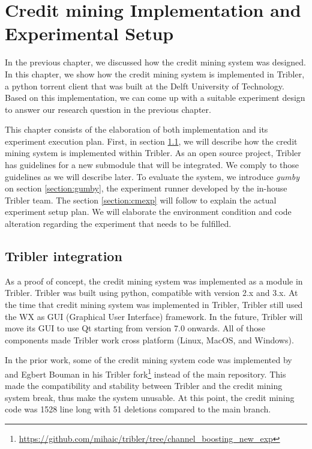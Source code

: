 \chapter{Credit mining Implementation and Experimental Setup}
\label{chp:implexperiment}
In the previous chapter, we discussed how the credit mining system was designed. In this chapter, we show how the credit mining system is implemented in Tribler, a python torrent client that was built at the Delft University of Technology. Based on this implementation, we can come up with a suitable experiment design to answer our research question in the previous chapter. 

This chapter consists of the elaboration of both implementation and its experiment execution plan. First, in section \ref{section:triblerintregration}, we will describe how the credit mining system is implemented within Tribler. As an open source project, Tribler has guidelines for a new submodule that will be integrated. We comply to those guidelines as we will describe later. To evaluate the system, we introduce \textit{gumby} on section \ref{section:gumby}, the experiment runner developed by the in-house Tribler team. The section \ref{section:cmexp} will follow to explain the actual experiment setup plan. We will elaborate the environment condition and code alteration regarding the experiment that needs to be fulfilled.

\section{Tribler integration}
\label{section:triblerintregration}
As a proof of concept, the credit mining system was implemented as a module in Tribler. Tribler was built using python, compatible with version 2.x and 3.x. At the time that credit mining system was implemented in Tribler, Tribler still used the WX as GUI (Graphical User Interface) framework. In the future, Tribler will move its GUI to use Qt starting from version 7.0 onwards. All of those components made Tribler work cross platform (Linux, MacOS, and Windows).

In the prior work, some of the credit mining system code was implemented by \citeauthor{2015:creditmining:capota} and Egbert Bouman in his Tribler fork\footnote{\url{https://github.com/mihaic/tribler/tree/channel_boosting_new_exp}} instead of the main repository. This made the compatibility and stability between Tribler and the credit mining system break, thus make the system unusable. At this point, the credit mining code was 1528 line long with 51 deletions compared to the main branch.

